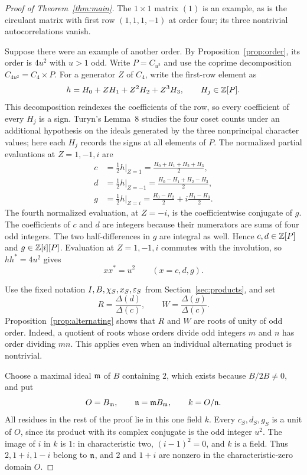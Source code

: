 \begin{proof}[Proof of Theorem~\ref{thm:main}]
The \(1\times1\) matrix \((1)\) is an example, as is the circulant
matrix with first row \((1,1,1,-1)\) at order four; its three
nontrivial autocorrelations vanish.

Suppose there were an example of another order. By
Proposition~\ref{prop:order}, its order is \(4u^2\) with \(u>1\) odd.
Write \(P=C_{u^2}\) and use the coprime decomposition
\(C_{4u^2}=C_4\times P\). For a generator \(Z\) of \(C_4\), write
the first-row element as
\[
 h=H_0+ZH_1+Z^2H_2+Z^3H_3,\qquad H_j\in\mathbb Z[P].
\]
This decomposition reindexes the coefficients of the row, so every
coefficient of every \(H_j\) is a sign. Turyn's Lemma~8
\cite[p.~337]{Turyn1965} studies the four coset counts under an
additional hypothesis on the ideals generated by the three nonprincipal
character values; here each \(H_j\) records the signs at
all elements of \(P\). The normalized partial evaluations at
\(Z=1,-1,i\) are
\begin{equation}\label{eq:three-elements}
 \begin{aligned}
 c&=\tfrac12h\vert_{Z=1}
   =\frac{H_0+H_1+H_2+H_3}{2},\\
 d&=\tfrac12h\vert_{Z=-1}
   =\frac{H_0-H_1+H_2-H_3}{2},\\
 g&=\tfrac12h\vert_{Z=i}
   =\frac{H_0-H_2}{2}+i\frac{H_1-H_3}{2}.
 \end{aligned}
\end{equation}
The fourth normalized evaluation, at \(Z=-i\), is the coefficientwise conjugate
of \(g\). The coefficients of \(c\) and \(d\) are integers because
their numerators are sums of four odd integers. The two half-differences
in \(g\) are integral as well. Hence \(c,d\in\mathbb Z[P]\) and
\(g\in\mathbb Z[i][P]\). Evaluation at \(Z=1,-1,i\) commutes with the involution,
so \(hh^*=4u^2\) gives
\begin{equation}\label{eq:three-norms}
 xx^*=u^2\qquad(x=c,d,g).
\end{equation}

Use the fixed notation \(I,B,\chi_S,x_S,\varepsilon_S\) from
Section~\ref{sec:products}, and set
\[
 R=\frac{\Delta(d)}{\Delta(c)},\qquad
 W=\frac{\Delta(g)}{\Delta(c)}.
\]
Proposition~\ref{prop:alternating} shows that \(R\) and \(W\) are
roots of unity of odd order. Indeed, a quotient of roots whose orders
divide odd integers \(m\) and \(n\) has order dividing \(mn\).
This applies even when an individual alternating product is nontrivial.

Choose a maximal ideal \(\mathfrak m\) of \(B\) containing \(2\), which exists
because \(B/2B\ne0\), and put
\[
 O=B_{\mathfrak m},\qquad \mathfrak n=\mathfrak m B_{\mathfrak m},\qquad k=O/\mathfrak n.
\]
All residues in the rest of the proof lie in this one field \(k\).
Every \(c_S,d_S,g_S\) is a unit of \(O\), since its product with its
complex conjugate is the odd integer \(u^2\). The image of \(i\) in
\(k\) is \(1\): in characteristic two, \((i-1)^2=0\), and \(k\)
is a field. Thus \(2,1+i,1-i\) belong to \(\mathfrak n\), and \(2\) and
\(1+i\) are nonzero in the characteristic-zero domain \(O\).


\end{proof}
